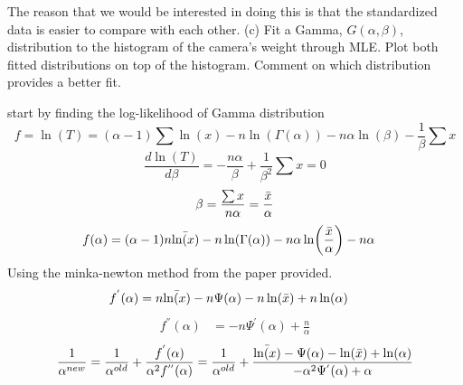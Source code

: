 \documentclass{article}
\begin{document}
The reason that we would be interested in doing this is that the standardized data is easier to compare with each other.
\newline
(c) Fit a Gamma, $G(\alpha, \beta)$, distribution to the histogram of the camera's weight through MLE. Plot both fitted distributions on top of the histogram. Comment on which distribution provides a better fit.

start by finding the log-likelihood of Gamma distribution
\begin{equation}
  f=\ln(T) = (\alpha-1) \sum \ln(x)  - n\ln(\Gamma(\alpha)) - n\alpha \ln(\beta)-\frac{1}{\beta}\sum x 
\end{equation}
\begin{equation}
  \frac{d\ln(T)}{d\beta} =  -\frac{n\alpha}{\beta}+\frac{1}{\beta^2}\sum x =0 
\end{equation}
\begin{equation}
  \beta = \frac{\sum x}{n \alpha} = \frac{\Bar{x}}{\alpha}
\end{equation}
\begin{equation}
\begin{aligned}
  f(\alpha) &= (\alpha-1)n \Bar{\ln(x)} - n \ln(\Gamma(\alpha))-n\alpha \ln(\frac{\Bar{x}}{\alpha})-n\alpha 
\end{aligned}
\end{equation}
Using the minka-newton method from the paper provided.
\begin{equation}
\begin{aligned}
  f^{'}(\alpha) &= n \Bar{\ln(x)} - n \Psi(\alpha)-n \ln(\Bar{x})+n\ln(\alpha)
\end{aligned}
\end{equation}
\begin{equation}
\begin{aligned}
  f^{''} (\alpha)&=  - n \Psi^{'}(\alpha)+\frac{n}{\alpha}
\end{aligned}
\end{equation}
\begin{equation}
\begin{aligned}
  \frac{1}{\alpha^{new}} = \frac{1}{\alpha^{old}}+ \frac{f^{'}(\alpha)}{\alpha^2 f^{''}(\alpha)} = \frac{1}{\alpha^{old}}+ \frac{ \Bar{\ln(x)} -  \Psi(\alpha)- \ln(\Bar{x})+\ln(\alpha)}{-  \alpha^{2}\Psi^{'}(\alpha)+\alpha}
\end{aligned}
\end{equation}
\end{document}
